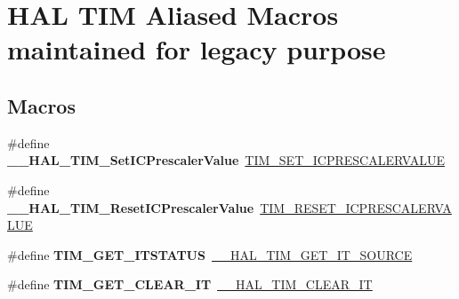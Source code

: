 \hypertarget{group___h_a_l___t_i_m___aliased___macros}{}\section{H\+AL T\+IM Aliased Macros maintained for legacy purpose}
\label{group___h_a_l___t_i_m___aliased___macros}
\subsection*{Macros}
\begin{DoxyCompactItemize}
\item 
\mbox{\label{group___h_a_l___t_i_m___aliased___macros_ga1f487f25516b3fd87b864f5be8229b7e}} 
\#define {\bfseries \+\_\+\+\_\+\+H\+A\+L\+\_\+\+T\+I\+M\+\_\+\+Set\+I\+C\+Prescaler\+Value}~\hyperlink{group___t_i_m___private___macros_ga99724157918ca8b4d8babee1d8008dcb}{T\+I\+M\+\_\+\+S\+E\+T\+\_\+\+I\+C\+P\+R\+E\+S\+C\+A\+L\+E\+R\+V\+A\+L\+UE}
\item 
\mbox{\label{group___h_a_l___t_i_m___aliased___macros_gac171a25ce55eafe62671d40d7397d721}} 
\#define {\bfseries \+\_\+\+\_\+\+H\+A\+L\+\_\+\+T\+I\+M\+\_\+\+Reset\+I\+C\+Prescaler\+Value}~\hyperlink{group___t_i_m___private___macros_ga18ded32faf42c8981c8d2970bb02e126}{T\+I\+M\+\_\+\+R\+E\+S\+E\+T\+\_\+\+I\+C\+P\+R\+E\+S\+C\+A\+L\+E\+R\+V\+A\+L\+UE}
\item 
\mbox{\label{group___h_a_l___t_i_m___aliased___macros_ga1dd7eae80b853d3526091193e81b4731}} 
\#define {\bfseries T\+I\+M\+\_\+\+G\+E\+T\+\_\+\+I\+T\+S\+T\+A\+T\+US}~\hyperlink{group___t_i_m___exported___macros_ga644babf93470a6eee6bce8906c4da5c5}{\+\_\+\+\_\+\+H\+A\+L\+\_\+\+T\+I\+M\+\_\+\+G\+E\+T\+\_\+\+I\+T\+\_\+\+S\+O\+U\+R\+CE}
\item 
\mbox{\label{group___h_a_l___t_i_m___aliased___macros_gadd580b2357a85c03653006349721a36e}} 
\#define {\bfseries T\+I\+M\+\_\+\+G\+E\+T\+\_\+\+C\+L\+E\+A\+R\+\_\+\+IT}~\hyperlink{group___t_i_m___exported___macros_gaea68155ce77e591e0c2582def061d6f0}{\+\_\+\+\_\+\+H\+A\+L\+\_\+\+T\+I\+M\+\_\+\+C\+L\+E\+A\+R\+\_\+\+IT}
\item 

\end{DoxyCompactItemize}

